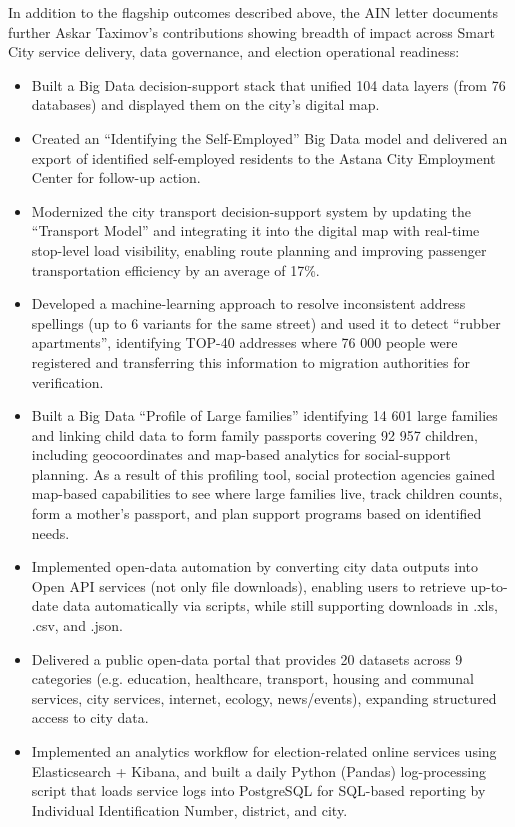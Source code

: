In addition to the flagship outcomes described above, the AIN letter documents further Askar Taximov’s contributions showing breadth of impact across Smart City service delivery, data governance, and election operational readiness:
\vspace{-0.5\baselineskip}
\begin{itemize}[nosep]
\item Built a Big Data decision-support stack that unified 104 data layers (from 76 databases) and displayed them on the city’s digital map.
\item Created an “Identifying the Self-Employed” Big Data model and delivered an export of identified self-employed residents to the Astana City Employment Center for follow-up action.
\item Modernized the city transport decision-support system by updating the “Transport Model” and integrating it into the digital map with real-time stop-level load visibility, enabling route planning and improving passenger transportation efficiency by an average of 17\%.
\item Developed a machine-learning approach to resolve inconsistent address spellings (up to 6 variants for the same street) and used it to detect “rubber apartments”, identifying TOP-40 addresses where 76 000 people were registered and transferring this information to migration authorities for verification.
\item Built a Big Data “Profile of Large families” identifying 14 601 large families and linking child data to form family passports covering 92 957 children, including geocoordinates and map-based analytics for social-support planning. As a result of this profiling tool, social protection agencies gained map-based capabilities to see where large families live, track children counts, form a mother’s passport, and plan support programs based on identified needs.
\item Implemented open-data automation by converting city data outputs into Open API services (not only file downloads), enabling users to retrieve up-to-date data automatically via scripts, while still supporting downloads in .xls, .csv, and .json.
\item Delivered a public open-data portal that provides 20 datasets across 9 categories (e.g. education, healthcare, transport, housing and communal services, city services, internet, ecology, news/events), expanding structured access to city data.
\item Implemented an analytics workflow for election-related online services using Elasticsearch + Kibana, and built a daily Python (Pandas) log-processing script that loads service logs into PostgreSQL for SQL-based reporting by Individual Identification Number, district, and city.

\end{itemize}
